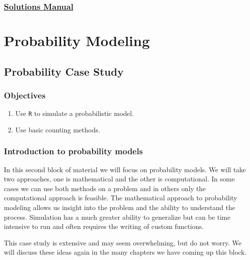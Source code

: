 \documentclass[
  letterpaper,
  DIV=11,
  numbers=noendperiod]{scrreprt}
\begin{document}
\section*{\texorpdfstring{\href{https://ds-usafa.github.io/CPS-Solutions-Manual/CATDATA.html}{Solutions
Manual}}{Solutions Manual}}\label{solutions-manual-6}


\part{Probability Modeling}

\chapter{Probability Case Study}\label{CS2}

\section{Objectives}\label{objectives-7}

\begin{enumerate}
\def\labelenumi{\arabic{enumi})}
\item
  Use \texttt{R} to simulate a probabilistic model.
\item
  Use basic counting methods.
\end{enumerate}

\section{Introduction to probability
models}\label{introduction-to-probability-models}

In this second block of material we will focus on probability models. We
will take two approaches, one is mathematical and the other is
computational. In some cases we can use both methods on a problem and in
others only the computational approach is feasible. The mathematical
approach to probability modeling allows us insight into the problem and
the ability to understand the process. Simulation has a much greater
ability to generalize but can be time intensive to run and often
requires the writing of custom functions.

This case study is extensive and may seem overwhelming, but do not
worry. We will discuss these ideas again in the many chapters we have
coming up this block.
\end{document}
